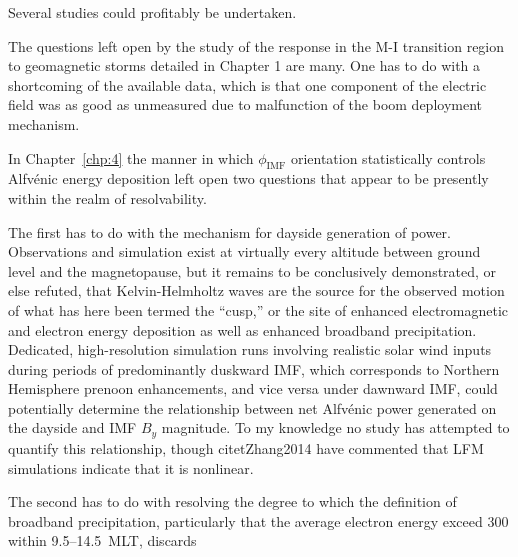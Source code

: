   Several studies could profitably be undertaken. 

  The questions left open by the study of the \Alfic response in the
  M-I transition region to geomagnetic storms detailed in Chapter 1
  are many. One has to do with a shortcoming of the available data,
  which is that one component of the electric field was as good as
  unmeasured due to malfunction of the boom deployment mechanism. 

  In Chapter~\ref{chp:4} the manner in which $\phi_{\textrm{IMF}}$
  orientation statistically controls Alfv\'{e}nic energy deposition
  left open two questions that appear to be presently within the realm of
  resolvability. 

  The first has to do with the mechanism for dayside generation of
  \Alfic power. Observations and simulation exist at virtually every
  altitude between ground level and the magnetopause, but it remains
  to be conclusively demonstrated, or else refuted, that
  Kelvin-Helmholtz waves are the source for the observed motion of
  what has here been termed the ``\Alfic cusp,'' or the site of
  enhanced \Alfic electromagnetic and electron energy deposition as
  well as enhanced broadband precipitation. Dedicated, high-resolution
  simulation runs involving realistic solar wind inputs during periods
  of predominantly duskward IMF, which corresponds to Northern
  Hemisphere prenoon \Alfic enhancements, and vice versa under
  dawnward IMF, could potentially determine the relationship between
  net Alfv\'{e}nic power generated on the dayside and IMF $B_y$
  magnitude. To my knowledge no study has attempted to quantify this
  relationship, though citet{Zhang2014} have commented that LFM
  simulations indicate that it is nonlinear.

  The second has to do with resolving the degree to which the
  \citet{Newell2009} definition of broadband precipitation,
  particularly that the average electron energy exceed 300 within 9.5--14.5~MLT,
  discards 

  
  
